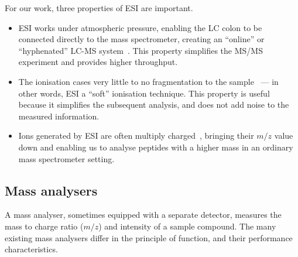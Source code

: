 For our work, three properties of ESI are important.

\begin{itemize}
  \item ESI works under atmospheric pressure, enabling the LC colon to be connected directly to the mass spectrometer, creating an ``online'' or ``hyphenated'' LC-MS system~\cite{opiteck1997comprehensive}. This property simplifies the MS/MS experiment and provides higher throughput.
  \item The ionisation cases very little to no fragmentation to the sample~\cite{griffiths2001electrospray} --- in other words, ESI a ``soft'' ionisation technique. This property is useful because it simplifies the subsequent analysis, and does not add noise to the measured information.
  \item  Ions generated by ESI are often multiply charged~\cite{felitsyn2002origin}, bringing their \(m/z\) value down and enabling us to analyse peptides with a higher mass in an ordinary mass spectrometer setting.
\end{itemize}

\subsection{Mass analysers}\label{sec:msms-analysis}

A mass analyser, sometimes equipped with a separate detector, measures the mass to charge ratio (\(m/z\)) and intensity of a sample compound. The many existing mass analysers differ in the principle of function, and their performance characteristics.

